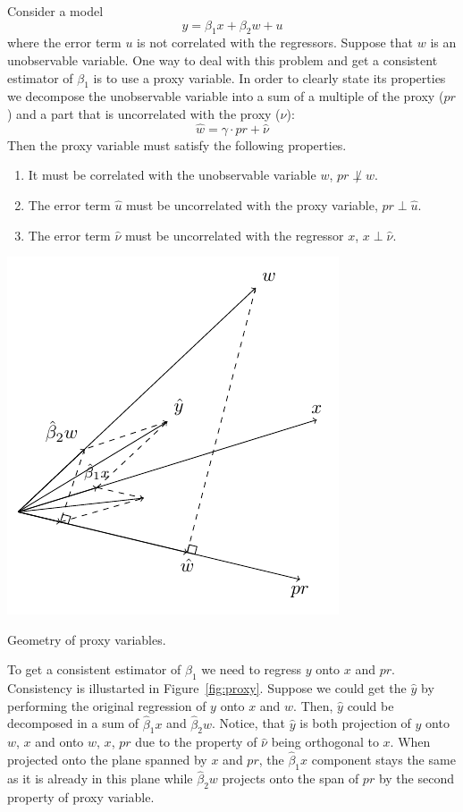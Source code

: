 Consider a model
\[
y = \beta_1 x + \beta_2 w + u
\]
where the error term $u$ is not correlated with the regressors.
Suppose that $w$ is an unobservable variable.
One way to deal with this problem and get a consistent estimator of $\beta_1$ is to use a proxy variable.
In order to clearly state its properties we decompose the unobservable variable
into a sum of a multiple of the proxy ($pr$) and a part that is uncorrelated
with the proxy ($\hat \nu$):
\[
\hat w = \gamma \cdot pr + \hat \nu
\]
Then the proxy variable must satisfy the following properties.
\begin{enumerate}
  \item It must be correlated with the unobservable variable $w$, $pr \not\perp w$.
  \item The error term $\hat u$ must be uncorrelated with the proxy variable, $pr \perp \hat u$.
  \item The error term $\hat \nu$ must be uncorrelated with the regressor $x$, $x \perp \hat \nu$.
\end{enumerate}

\begin{marginfigure}
\includegraphics[scale=0.85]{figures/02_proxy.pdf}
\caption{Geometry of proxy variables.}
\label{fig:proxy}
\end{marginfigure}

To get a consistent estimator of $\beta_1$ we need to regress $y$ onto $x$ and $pr$.
Consistency is illustarted in Figure~\ref{fig:proxy}.
Suppose we could get the $\hat y$ by performing the original regression of
$y$ onto $x$ and $w$. Then, $\hat y$ could be decomposed in a sum of
$\hat \beta_1 x$ and $\hat \beta_2 w$.
Notice, that $\hat y$ is both projection of $y$ onto $w$, $x$ and
onto $w$, $x$, $pr$ due to the property of $\hat \nu$ being orthogonal to $x$.
When projected onto the plane spanned by $x$ and $pr$, the $\hat \beta_1 x$
component stays the same as it is already in this plane
while $\hat \beta_2 w$ projects onto the span of $pr$ by the second property of proxy variable.
